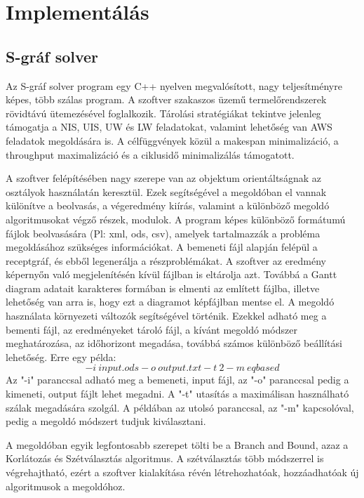 \chapter{Implementálás}
\section{S-gráf solver}
Az S-gráf solver program egy C++ nyelven megvalósított, nagy teljesítményre képes, több szálas program. A szoftver szakaszos üzemű termelőrendszerek rövidtávú ütemezésével foglalkozik. Tárolási stratégiákat tekintve jelenleg támogatja a NIS, UIS, UW és LW feladatokat, valamint lehetőség van AWS feladatok megoldására is. A célfüggvények közül a makespan minimalizáció, a throughput maximalizáció és a ciklusidő minimalizálás támogatott. 

A szoftver felépítésében nagy szerepe van az objektum orientáltságnak az osztályok használatán keresztül. Ezek segítségével a megoldóban el vannak különítve a beolvasás, a végeredmény kiírás, valamint a különböző megoldó algoritmusokat végző részek, modulok. A program képes különböző formátumú fájlok beolvasására (Pl: xml, ods, csv), amelyek tartalmazzák a probléma megoldásához szükséges információkat. A bemeneti fájl alapján felépül a receptgráf, és ebből legenerálja a részproblémákat. A szoftver az eredmény képernyőn való megjelenítésén kívül fájlban is eltárolja azt. Továbbá a Gantt diagram adatait karakteres formában is elmenti az említett fájlba, illetve lehetőség van arra is, hogy ezt a diagramot képfájlban mentse el. A megoldó használata környezeti változók segítségével történik. Ezekkel adható meg a bementi fájl, az eredményeket tároló fájl, a kívánt megoldó módszer meghatározása, az időhorizont megadása, továbbá számos különböző beállítási lehetőség. Erre egy példa: $$-i\:input.ods -o\: output.txt -t\:2 -m\:eqbased$$ Az "-i" paranccsal adható meg a bemeneti, input fájl, az "-o" paranccsal pedig a kimeneti, output fájlt lehet megadni. A "-t" utasítás a maximálisan használható szálak megadására szolgál. A példában az utolsó paranccsal, az "-m" kapcsolóval, pedig a megoldó módszert tudjuk kiválasztani.

A megoldóban egyik legfontosabb szerepet tölti be a Branch and Bound, azaz a Korlátozás és Szétválasztás algoritmus. A szétválasztás több módszerrel is végrehajtható, ezért a szoftver kialakítása révén létrehozhatóak, hozzáadhatóak új algoritmusok a megoldóhoz.

